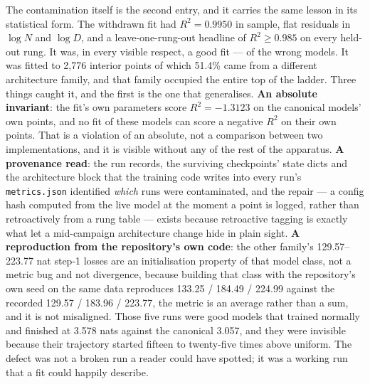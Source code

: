 \documentclass[11pt,a4paper]{article}
\begin{document}
The contamination itself is the second entry, and it carries the same lesson
in its statistical form. The withdrawn fit had $R^2 = 0.9950$ in sample, flat
residuals in $\log N$ and $\log D$, and a leave-one-rung-out headline of
$R^2 \geq 0.985$ on every held-out rung. It was, in every visible respect, a
good fit --- of the wrong models. It was fitted to 2,776 interior points of
which 51.4\% came from a different architecture family, and that family
occupied the entire top of the ladder. Three things caught it, and the first
is the one that generalises. \textbf{An absolute invariant}: the fit's own
parameters score $R^2 = -1.3123$ on the canonical models' own points, and no
fit of these models can score a negative $R^2$ on their own points. That is
a violation of an absolute, not a comparison between two implementations, and
it is visible without any of the rest of the apparatus. \textbf{A provenance
read}: the run records, the surviving checkpoints' state dicts and the
architecture block that the training code writes into every run's
\texttt{metrics.json} identified \emph{which} runs were contaminated, and the
repair --- a config hash computed from the live model at the moment a point
is logged, rather than retroactively from a rung table --- exists because
retroactive tagging is exactly what let a mid-campaign architecture change
hide in plain sight. \textbf{A reproduction from the repository's own code}:
the other family's 129.57--223.77 nat step-1 losses are an initialisation
property of that model class, not a metric bug and not divergence, because
building that class with the repository's own seed on the same data
reproduces 133.25 / 184.49 / 224.99 against the recorded 129.57 / 183.96 /
223.77, the metric is an average rather than a sum, and it is not misaligned.
Those five runs were good models that trained normally and finished at 3.578
nats against the canonical 3.057, and they were invisible because their
trajectory started fifteen to twenty-five times above uniform. The defect was
not a broken run a reader could have spotted; it was a working run that a fit
could happily describe. %
\end{document}
